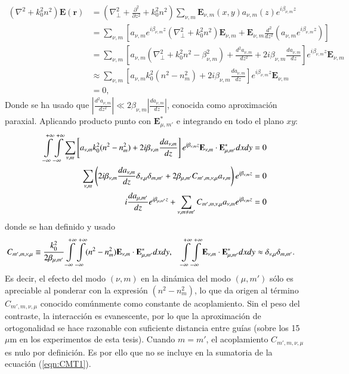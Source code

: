 \begin{align}
	(\nabla^2  + k_0^2n^2) \textbf{E}(\textbf{r}) &= \left(\nabla_\perp^2 + \frac{\partial^2}{\partial z^2} + k_0^2n^2 \right)\sum_{\nu, m} \textbf{E}_{\nu, m}(x, y) a_{\nu, m}(z) e^{i\beta_{\nu, m} z}
	\nonumber
	\\
	&= \sum_{\nu, m} \left[a_{\nu, m} e^{i\beta_{\nu, m} z} \left(\nabla_\perp^2 +k_0^2n^2 \right)\textbf{E}_{\nu, m} + \textbf{E}_{\nu, m}\frac{d^2}{d z^2}\left(a_{\nu, m} e^{i\beta_{\nu, m} z}\right)\right]
	\nonumber	
	\\
	&= \sum_{\nu, m} \left[a_{\nu, m}  \left(\nabla_\perp^2 +k_0^2n^2 -\beta_{\nu,m}^2 \right) + \frac{d^2 a_{\nu, m}}{d z^2}  +2i\beta_{\nu,m}\frac{d a_{\nu, m}}{d z} \right]e^{i\beta_{\nu, m} z}\textbf{E}_{\nu, m}
		\nonumber	
	\\
	&\approx \sum_{\nu, m} \left[a_{\nu, m}  k_0^2(n^2 - n^2_{m}) +2i\beta_{\nu,m}\frac{d a_{\nu, m}}{d z} \right]e^{i\beta_{\nu, m} z}\textbf{E}_{\nu, m}
	\nonumber	
	\\
	&= 0,
	\nonumber	
\end{align}
Donde se ha usado que $\left|\frac{d^2 a_{\nu, m}}{d z^2}\right|\ll 2\beta_{\nu,m}\left|\frac{d a_{\nu, m}}{d z}\right|  $, conocida como aproximación paraxial. Aplicando producto punto con $\textbf{E}_{\mu, m'}^*$ e integrando en todo el plano $xy$:
\begin{align}
	  \int\displaylimits_{-\infty}^{+\infty}\int\displaylimits_{-\infty}^{+\infty} \sum_{\nu, m} \left[a_{\nu, m}  k_0^2(n^2 - n^2_{m}) +2i\beta_{\nu,m}\frac{d a_{\nu, m}}{d z} \right]e^{i\beta_{\nu, m} z}\textbf{E}_{\nu, m} \cdot \textbf{E}_{\mu, m'}^* dxdy &= 0
	  \nonumber
	  \\
	  \sum_{\nu, m} \left(2i\beta_{\nu,m}\frac{d a_{\nu, m}}{d z} \delta_{\nu,\mu}\delta_{m,m'} +  2\beta_{\mu, m'}C_{m', m, \nu, \mu}   a_{\nu, m} \right)e^{i\beta_{\nu, m} z} &= 0
	  \nonumber
	  \\
	  	  i\frac{d a_{\mu, m'}}{d z} e^{i\beta_{\mu, m'} z} +  \sum_{\nu, m\neq m'}C_{m', m, \nu, \mu}   a_{\nu, m} e^{i\beta_{\nu, m} z} &= 0
	\label{eqn:CMT1}
\end{align}
donde se han definido y usado
\begin{align*}
	   C_{m', m, \nu, \mu} &\equiv \frac{k_0^2}{2\beta_{\mu, m'}}\int\displaylimits_{-\infty}^{+\infty}\int\displaylimits_{-\infty}^{+\infty} (n^2 - n^2_{m}) \textbf{E}_{\nu, m} \cdot \textbf{E}_{\mu, m'}^* dxdy , \quad\int\displaylimits_{-\infty}^{+\infty}\int\displaylimits_{-\infty}^{+\infty} \textbf{E}_{\nu, m} \cdot \textbf{E}_{\mu, m'}^* dxdy \approx \delta_{\nu,\mu}\delta_{m,m'}.
\end{align*}
Es decir, el efecto del modo $(\nu, m)$ en la dinámica del modo $(\mu, m')$ sólo es apreciable al ponderar con la expresión $(n^2 - n^2_{m})$, lo que da origen al término $C_{m', m, \nu, \mu}$ conocido comúnmente como constante de acoplamiento. Sin el peso del contraste, la interacción es evanescente, por lo que la aproximación de ortogonalidad se hace razonable con suficiente distancia entre guías (sobre los 15 $\mu$m en los experimentos de esta tesis). Cuando $m=m'$, el acoplamiento $C_{m', m, \nu, \mu}$ es nulo por definición. Es por ello que no se incluye en la sumatoria de la ecuación (\ref{eqn:CMT1}). 

